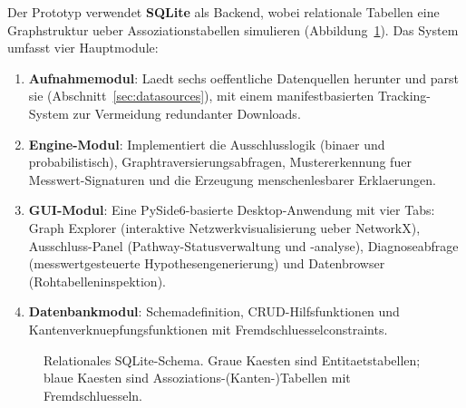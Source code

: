 \documentclass[12pt,a4paper]{article}
\begin{document}
Der Prototyp verwendet \textbf{SQLite} als Backend, wobei relationale Tabellen eine Graphstruktur ueber Assoziationstabellen simulieren (Abbildung~\ref{fig:schema_sql}). Das System umfasst vier Hauptmodule:

\begin{enumerate}
    \item \textbf{Aufnahmemodul}: Laedt sechs oeffentliche Datenquellen herunter und parst sie (Abschnitt~\ref{sec:datasources}), mit einem manifestbasierten Tracking-System zur Vermeidung redundanter Downloads.
    \item \textbf{Engine-Modul}: Implementiert die Ausschlusslogik (binaer und probabilistisch), Graphtraversierungsabfragen, Mustererkennung fuer Messwert-Signaturen und die Erzeugung menschenlesbarer Erklaerungen.
    \item \textbf{GUI-Modul}: Eine PySide6-basierte Desktop-Anwendung mit vier Tabs: Graph Explorer (interaktive Netzwerkvisualisierung ueber NetworkX), Ausschluss-Panel (Pathway-Statusverwaltung und -analyse), Diagnoseabfrage (messwertgesteuerte Hypothesengenerierung) und Datenbrowser (Rohtabelleninspektion).
    \item \textbf{Datenbankmodul}: Schemadefinition, CRUD-Hilfsfunktionen und Kantenverknuepfungsfunktionen mit Fremdschluesselconstraints.
\end{enumerate}

\begin{figure}[H]
\centering
{}
\caption{Relationales SQLite-Schema. Graue Kaesten sind Entitaetstabellen; blaue Kaesten sind Assoziations-(Kanten-)Tabellen mit Fremdschluesseln.}
\label{fig:schema_sql}
\end{figure}
\end{document}
